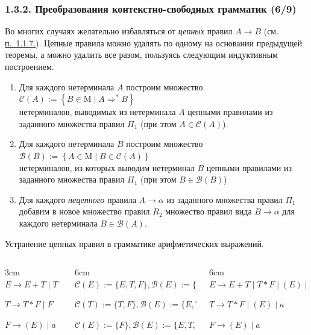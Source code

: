 \documentclass[mathserif,12pt,aspectratio=169]{beamer}
\def\emразделенной{\em разделенной}
\renewcommand{\index}[1]{}
\def\em#1{\it\color{blue}#1}
\def\odmkey#1#2{{\it\color{red} #1}\index{#2}}
\def\Set#1#2{\left\{ #1 \mid #2 \right\}}
\def\Assign{\operatorname{:=}}
\def\Mu{\mathrm{M}}
\let\cal\mathcal
\def\DMref#1#2{{\color{blue}\underline{\hyperlink{#2}{#1}}}}
\begin{document}
\begin{frame}
\frametitle{1.3.2. Преобразования контекстно-свободных грамматик (6/9)}


Во многих случаях желательно избавляться от 
\odmkey{цепных}{Правило!цепное} правил $A\to B$ 
(см. \DMref{п.~1.1.7.}{1.1.7.}).
Цепные правила можно удалять по одному на основании предыдущей теоремы,
а можно удалить все разом, 
пользуясь следующим индуктивным построением.

\begin{enumerate}
\item Для каждого нетерминала $A$ построим
множество 
$\cal{C}(A)\Assign\Set{B\in \Mu}{A\Rightarrow^* B}$\\
нетерминалов, выводимых из нетерминала $A$ 
цепными правилами из заданного множества правил $\Pi_1$ (при этом $A\in \cal{C}(A)$).
\item Для каждого нетерминала $B$ построим
множество $\cal{B}(B)\Assign\Set{A\in \Mu}{B\in \cal{C}(A)}$\\
нетерминалов, из которых выводим нетерминал $B$ 
цепными правилами из заданного множества правил $\Pi_1$ (при этом $B\in \cal{B}(B)$) 
\item Для каждого {\em нецепного}
правила $A\to\alpha$ из заданного множества правил $\Pi_1$ 
добавим в новое множество правил $R_2$
множество правил вида $B\to \alpha$ для каждого нетерминала 
$B\in\cal{B}(A)$.
\end{enumerate}

\begin{example}
Устранение цепных 
правил в грамматике арифметических выражений. 
\begin{columns}
\begin{column}{3cm}
$E\to E+T\mid T$

$T\to T*F\mid F$

$F\to (E)\mid a$
\end{column}
\begin{column}{6cm}
$\cal{C}(E)\Assign \{E, T, F\},\cal{B}(E)\Assign \{E\}$

$\cal{C}(T)\Assign \{T, F\},\cal{B}(E)\Assign \{E, T\}$

$\cal{C}(E)\Assign \{F\},\cal{B}(E)\Assign \{E, T, F\}$

\end{column}
\begin{column}{6cm}
$E\to E+T\mid T*F \mid (E) \mid a $

$T\to T*F\mid (E) \mid a $

$F\to (E)\mid a$
\end{column}
\end{columns}
\end{example}
\end{frame}
\end{document}
